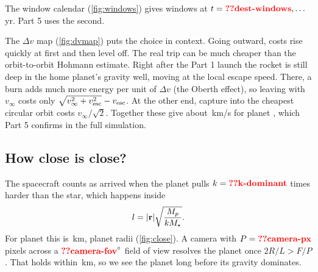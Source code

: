 \documentclass[aps,prd,twocolumn,nofootinbib,floatfix,superscriptaddress]{revtex4-2}
\begin{document}
The window calendar (\cref{fig:windows}) gives windows at $t=\val{dest-windows},\ldots$\,yr.
Part 5 uses the second.

The $\Delta v$ map (\cref{fig:dvmap}) puts the choice in context.
Going outward, costs rise quickly at first and then level off.
The real trip can be much cheaper than the orbit-to-orbit Hohmann estimate.
Right after the Part 1 launch the rocket is still deep in the home planet's gravity well, moving at the local escape speed.
There, a burn adds much more energy per unit of $\Delta v$ (the Oberth effect), so leaving with $v_\infty$ costs only $\sqrt{v_\infty^2+v_{\rm esc}^2}-v_{\rm esc}$.
At the other end, capture into the cheapest circular orbit costs $v_\infty/\sqrt2$.
Together these give about \,km/s for planet , which Part 5 confirms in the full simulation.

\subsection{How close is close?}
The spacecraft counts as arrived when the planet pulls $k=\val{k-dominant}$ times harder than the star, which happens inside
\begin{equation}
  l = |\mathbf{r}|\sqrt{\frac{M_p}{k M_\star}}.
\end{equation}
For planet  this is \,km,  planet radii (\cref{fig:close}).
A camera with $P=\val{camera-px}$ pixels across a $\val{camera-fov}^\circ$ field of view resolves the planet once $2R/L>F/P$.
That holds within \,km, so we see the planet long before its gravity dominates.


\end{document}
